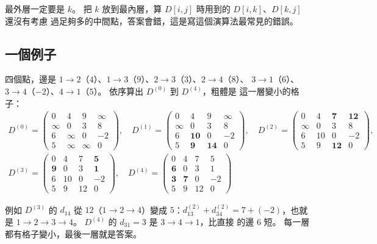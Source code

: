 最外層一定要是 $k$。 把 $k$ 放到最內層，算 $D[i, j]$ 時用到的 $D[i, k]$、$D[k, j]$ 還沒有考慮
過足夠多的中間點，答案會錯，這是寫這個演算法最常見的錯誤。

\subsection{一個例子}

四個點，邊是 $1 \to 2$（$4$）、$1 \to 3$（$9$）、$2 \to 3$（$3$）、$2 \to 4$（$8$）、
$3 \to 1$（$6$）、$3 \to 4$（$-2$）、$4 \to 1$（$5$）。 依序算出 $D^{(0)}$ 到 $D^{(4)}$，粗體是
這一層變小的格子：
\begin{gather*}
D^{(0)} = \begin{pmatrix} 0 & 4 & 9 & \infty \\ \infty & 0 & 3 & 8 \\ 6 & \infty & 0 & -2 \\ 5 & \infty & \infty & 0 \end{pmatrix},\quad D^{(1)} = \begin{pmatrix} 0 & 4 & 9 & \infty \\ \infty & 0 & 3 & 8 \\ 6 & \mathbf{10} & 0 & -2 \\ 5 & \mathbf{9} & \mathbf{14} & 0 \end{pmatrix},\quad D^{(2)} = \begin{pmatrix} 0 & 4 & \mathbf{7} & \mathbf{12} \\ \infty & 0 & 3 & 8 \\ 6 & 10 & 0 & -2 \\ 5 & 9 & \mathbf{12} & 0 \end{pmatrix}, \\
D^{(3)} = \begin{pmatrix} 0 & 4 & 7 & \mathbf{5} \\ \mathbf{9} & 0 & 3 & \mathbf{1} \\ 6 & 10 & 0 & -2 \\ 5 & 9 & 12 & 0 \end{pmatrix},\quad D^{(4)} = \begin{pmatrix} 0 & 4 & 7 & 5 \\ \mathbf{6} & 0 & 3 & 1 \\ \mathbf{3} & \mathbf{7} & 0 & -2 \\ 5 & 9 & 12 & 0 \end{pmatrix}
\end{gather*}

例如 $D^{(3)}$ 的 $d_{14}$ 從 $12$（$1 \to 2 \to 4$）變成 $5$：$d_{13}^{(2)} + d_{34}^{(2)} =
7 + (-2)$，也就是 $1 \to 2 \to 3 \to 4$。 $D^{(4)}$ 的 $d_{31} = 3$ 是 $3 \to 4 \to 1$，比直接
的邊 $6$ 短。 每一層都有格子變小，最後一層就是答案。

